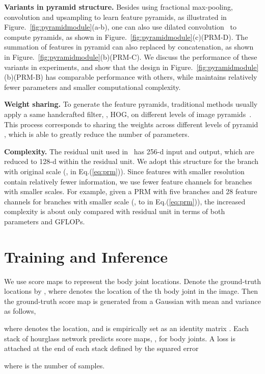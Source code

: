 \documentclass[10pt,twocolumn,letterpaper]{article}
\newcommand{\smalltitle}[1]{\vspace{0.2em}\noindent \textbf{{#1}}}
\begin{document}
\smalltitle{Variants in pyramid structure. } Besides using fractional max-pooling, convolution and upsampling to learn feature pyramids, as illustrated in Figure.~\ref{fig:pyramidmodule}(a-b), one can also use dilated convolution~\cite{chen2016deeplab,yu2016multi} to compute pyramids, as shown in Figure.~\ref{fig:pyramidmodule}(c)(PRM-D). 
The summation of features in pyramid can also replaced by concatenation, as shown in Figure.~\ref{fig:pyramidmodule}(b)(PRM-C). 
We discuss the performance of these variants in experiments, and show that the design in Figure.~\ref{fig:pyramidmodule}(b)(PRM-B) has comparable performance with others, while maintains relatively fewer parameters and smaller computational complexity.  

\smalltitle{Weight sharing. }
To generate the feature pyramids, traditional methods usually apply a same handcrafted filter, \eg, HOG, on different levels of image pyramids~\cite{adelson1984pyramid,felzenszwalb2010object}. 
This process corresponds to sharing the weights  across different levels of pyramid , which is able to greatly reduce the number of parameters.


\smalltitle{Complexity. }
The residual unit used in~\cite{newell2016stacked} has 256-d input and output, which are reduced to 128-d within the residual unit. 
We adopt this structure for the branch with original scale (\ie,  in Eq.(\ref{eq:prm})). 
Since features with smaller resolution contain relatively fewer information, we use fewer feature channels for branches with smaller scales. 
For example, given a PRM with five branches and 28 feature channels for branches with smaller scale (\ie,  to  in Eq.(\ref{eq:prm})), the increased complexity is about only  compared with residual unit in terms of both parameters and GFLOPs. 








\section{Training and Inference}
We use score maps to represent the body joint locations. Denote the ground-truth locations by , where  denotes the location of the th body joint in the image. Then the ground-truth score map  is generated from a Gaussian with mean  and variance  as follows,
{\small

}
\!\!where  denotes the location, and  is empirically set as an identity matrix . Each stack of hourglass network predicts  score maps, \ie , for  body joints. A loss is attached at the end of each stack defined by the squared error
{\small

}
\!\!where  is the number of samples.
\end{document}
